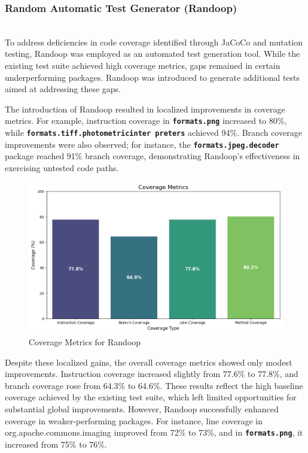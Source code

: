 \documentclass[sigconf]{acmart}
\begin{document}
\subsubsection{Random Automatic Test Generator (Randoop)}
\hfill\\
To address deficiencies in code coverage identified through JaCoCo and mutation testing, Randoop was employed as an automated test generation tool. While the existing test suite achieved high coverage metrics, gaps remained in certain underperforming packages. Randoop was introduced to generate additional tests aimed at addressing these gaps.

The introduction of Randoop resulted in localized improvements in coverage metrics. For example, instruction coverage in \textbf{\texttt{formats\allowbreak.png}} increased to 80\%, while \textbf{\texttt{formats.tiff.photometricinter \allowbreak preters}} achieved 94\%. Branch coverage improvements were also observed; for instance, the \textbf{\texttt{formats.jpeg.decoder}} package reached 91\% branch coverage, demonstrating Randoop's effectiveness in exercising untested code paths.

\begin{figure}[h!]
    \centering
    \includegraphics[width=1\linewidth]{Coverage_Metrics_Randoop.png}
    \caption{Coverage Metrics for Randoop}
    \label{fig:randoop}
\end{figure}


Despite these localized gains, the overall coverage metrics showed only modest improvements. Instruction coverage increased slightly from 77.6\% to 77.8\%, and branch coverage rose from 64.3\% to 64.6\%. These results reflect the high baseline coverage achieved by the existing test suite, which left limited opportunities for substantial global improvements. However, Randoop successfully enhanced coverage in weaker-performing packages. For instance, line coverage in org.apache.commons.imaging improved from 72\% to 73\%, and in \textbf{\texttt{formats.png}}, it increased from 75\% to 76\%.
\end{document}
